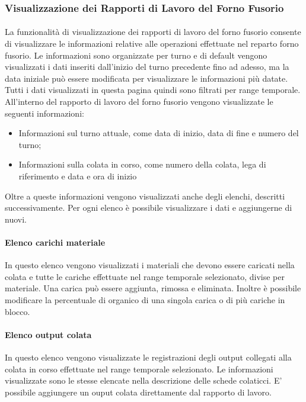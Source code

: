   \subsubsection{Visualizzazione dei Rapporti di Lavoro del Forno Fusorio}
  \paragraph{}
  La funzionalità di visualizzazione dei rapporti di lavoro del forno fusorio consente di visualizzare 
  le informazioni relative alle operazioni effettuate nel reparto forno fusorio. Le informazioni sono 
  organizzate per turno e di default vengono visualizzati i dati inseriti dall’inizio del turno 
  precedente fino ad adesso, ma la data iniziale può essere modificata per visualizzare le informazioni 
  più datate. Tutti i dati visualizzati in questa pagina quindi sono filtrati per range temporale.\\
  All’interno del rapporto di lavoro del forno fusorio vengono visualizzate le seguenti informazioni:
  \begin{itemize}
    \item Informazioni sul turno attuale, come data di inizio, data di fine e numero del turno;
    \item Informazioni sulla colata in corso, come numero della colata, lega di riferimento e data e ora 
    di inizio
  \end{itemize}
  Oltre a queste informazioni vengono visualizzati anche degli elenchi, descritti successivamente. 
  Per ogni elenco è possibile visualizzare i dati e aggiungerne di nuovi.
  \paragraph{Elenco carichi materiale}
  In questo elenco vengono visualizzati i materiali che devono essere caricati nella colata e 
  tutte le cariche effettuate nel range temporale selezionato, divise per materiale. 
  Una carica può essere aggiunta, rimossa e eliminata. Inoltre è possibile modificare la percentuale 
  di organico di una singola carica o di più cariche in blocco.

  \paragraph{Elenco output colata}
  In questo elenco vengono visualizzate le registrazioni degli output collegati alla colata in corso 
  effettuate nel range temporale selezionato. Le informazioni visualizzate sono le stesse elencate 
  nella descrizione delle schede colaticci. E' possibile aggiungere un ouput colata direttamente dal 
  rapporto di lavoro.
  
